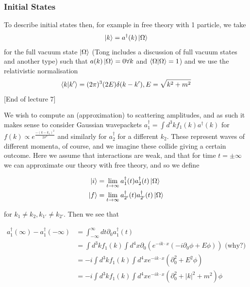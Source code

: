 \documentclass{article}
\theoremstyle{definition}
\begin{document}
\subsubsection{Initial States}

To describe initial states then, for example in free theory with 1 particle, we
take
\begin{equation}
  \ket{k} = a^\dagger(k) \ket{\Omega}
\end{equation}
for the full vacuum state $\ket{\Omega}$ (Tong includes a discussion of full
vacuum states and another type) such that $a(k) \ket{\Omega} = 0 \forall k$ and
$\bra{\Omega} \ket{\Omega} = 1$) and we use the relativistic normalisation
\begin{equation}
  \bra{k} \ket{k'} = (2\pi)^3 (2E) \delta(k - k'), E = \sqrt{k^2 + m^2}
\end{equation}
[End of lecture 7]

We wish to compute an (approximation) to scattering amplitudes, and as such it
makes sense to consider Gaussian wavepackets $a_1^\dagger = \int d^3k f_1(k)
a^\dagger(k)$ for $f(k) \propto e^{\frac{-(k - k_1)^2}{2 \sigma^2}}$ and
similarly for $a_2^\dagger$ for a different $k_2$. These represent waves of
different momenta, of course, and we imagine these collide giving a certain
outcome. Here we assume that interactions are weak, and that for time $t = \pm
\infty$ we can approximate our theory with free theory, and so we define

\begin{align}
  \ket{i} &= \lim_{t \to \infty} a_1^\dagger(t) a_2^\dagger(t) \ket{\Omega} \\
  \ket{f} &= \lim_{t \to \infty} a_{2'}^\dagger(t) a_{2'}^\dagger(t) \ket{\Omega}
\end{align}

for $k_1 \neq k_2, k_{1'} \neq k_{2'}$. Then we see that

\begin{align*}
  a_1^\dagger(\infty) - a_1^\dagger(-\infty)
  &= \int_{-\infty}^\infty dt \partial_0 a_1^\dagger(t) \\
  &= \int d^3k f_1(k) \int d^4x \partial_0 \left( e^{-ik \cdot x}
    (-i \partial_0 \phi + E \phi) \right) \text{ (why?)} \\
  &= -i \int d^3k f_1(k) \int d^4x e^{-ik \cdot x} (\partial_0^2 + E^2 \phi) \\
  &= -i \int d^3 k f_1(k) \int d^4x e^{-ik \cdot x} (\partial_0^2 + |k|^2 + m^2) \phi
\end{align*}
\end{document}
